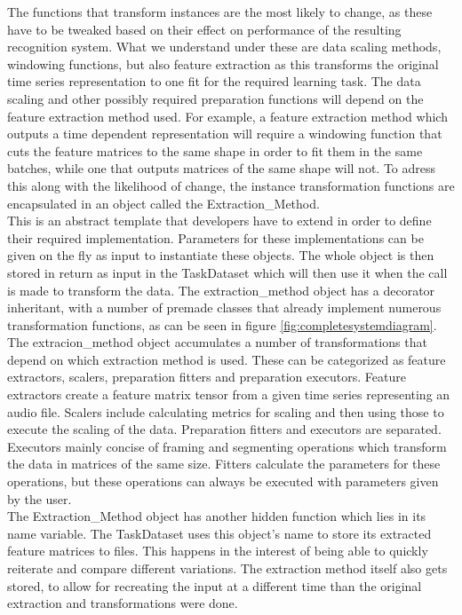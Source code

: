 The functions that transform instances are the most likely to change, as these have to be tweaked based on their effect on performance of the resulting recognition system. What we understand under these are data scaling methods, windowing functions, but also feature extraction as this transforms the original time series representation to one fit for the required learning task. The data scaling and other possibly required preparation functions will depend on the feature extraction method used. For example, a feature extraction method which outputs a time dependent representation will require a windowing function that cuts the feature matrices to the same shape in order to fit them in the same batches, while one that outputs matrices of the same shape will not. To adress this along with the likelihood of change, the instance transformation functions are encapsulated in an object called the Extraction\_Method. \\

This is an abstract template that developers have to extend in order to define their required implementation. Parameters for these implementations can be given on the fly as input to instantiate these objects. The whole object is then stored in return as input in the TaskDataset which will then use it when the call is made to transform the data. The extraction\_method object has a decorator inheritant, with a number of premade classes that already implement numerous transformation functions, as can be seen in figure \ref{fig:completesystemdiagram}.\\

The extracion\_method object accumulates a number of transformations that depend on which extraction method is used. These can be categorized as feature extractors, scalers, preparation fitters and preparation executors. Feature extractors create a feature matrix tensor from a given time series representing an audio file. Scalers include calculating metrics for scaling and then using those to execute the scaling of the data. Preparation fitters and executors are separated. Executors mainly concise of framing and segmenting operations which transform the data in matrices of the same size. Fitters calculate the parameters for these operations, but these operations can always be executed with parameters given by the user.\\

The Extraction\_Method object has another hidden function which lies in its name variable. The TaskDataset uses this object's name to store its extracted feature matrices to files. This happens in the interest of being able to quickly reiterate and compare different variations. The extraction method itself also gets stored, to allow for recreating the input at a different time than the original extraction and transformations were done.\\

